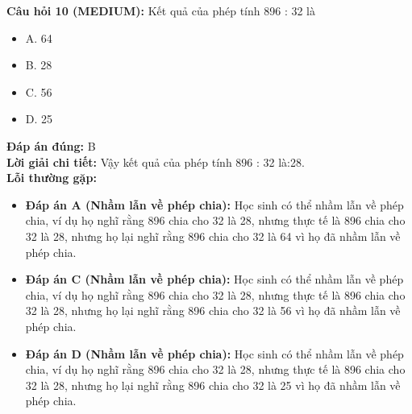 \documentclass{article}
\begin{document}
\begin{minipage}{\textwidth}
\noindent\textbf{Câu hỏi 10 (MEDIUM):} Kết quả của phép tính 896 : 32 là 
\begin{itemize}[label={}]
    \item A. 64
    \item B. 28
    \item C. 56
    \item D. 25
\end{itemize}
\textbf{Đáp án đúng:} B \\
\textbf{Lời giải chi tiết:} Vậy kết quả của phép tính 896 : 32 là:28. \\
\textbf{Lỗi thường gặp:}
\begin{itemize}
  \item \textbf{Đáp án A (Nhầm lẫn về phép chia):} Học sinh có thể nhầm lẫn về phép chia, ví dụ họ nghĩ rằng 896 chia cho 32 là 28, nhưng thực tế là 896 chia cho 32 là 28, nhưng họ lại nghĩ rằng 896 chia cho 32 là 64 vì họ đã nhầm lẫn về phép chia.
  \item \textbf{Đáp án C (Nhầm lẫn về phép chia):} Học sinh có thể nhầm lẫn về phép chia, ví dụ họ nghĩ rằng 896 chia cho 32 là 28, nhưng thực tế là 896 chia cho 32 là 28, nhưng họ lại nghĩ rằng 896 chia cho 32 là 56 vì họ đã nhầm lẫn về phép chia.
  \item \textbf{Đáp án D (Nhầm lẫn về phép chia):} Học sinh có thể nhầm lẫn về phép chia, ví dụ họ nghĩ rằng 896 chia cho 32 là 28, nhưng thực tế là 896 chia cho 32 là 28, nhưng họ lại nghĩ rằng 896 chia cho 32 là 25 vì họ đã nhầm lẫn về phép chia.
\end{itemize}
\end{minipage}
\vspace{1em}
\end{document}
